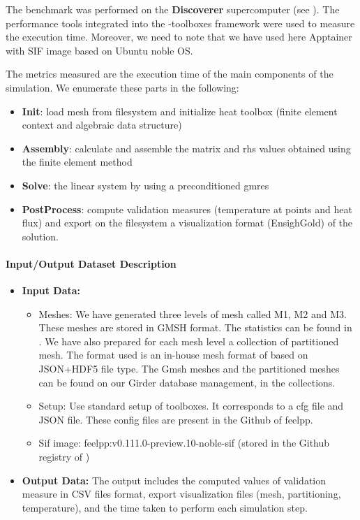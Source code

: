 The benchmark was performed on the \textbf{Discoverer} supercomputer (see
).
The performance tools integrated into the \Feelpp-toolboxes framework were used to measure
the execution time.
Moreover, we need to note that we have used here Apptainer with \Feelpp SIF image based on Ubuntu noble OS.

The metrics measured are the execution time of the main components of the simulation. We enumerate these parts in the following:
\begin{itemize}
\item \textbf{Init}: load mesh from filesystem and initialize heat toolbox (finite element context and algebraic data structure)
\item \textbf{Assembly}: calculate and assemble the matrix and rhs values obtained using the finite element method
\item \textbf{Solve}: the linear system by using a preconditioned gmres
\item \textbf{PostProcess}: compute validation measures (temperature at points and
  heat flux) and export on the filesystem a visualization format (EnsighGold) of
  the solution.
\end{itemize}

\paragraph{Input/Output Dataset Description}

\begin{itemize}
\item \textbf{Input Data:}
  \begin{itemize}
  \item Meshes: We have generated three levels of mesh called M1, M2
    and M3. These meshes are stored in GMSH format. The statistics can be found in
    . We have also prepared for
    each mesh level a collection of partitioned mesh.
    The format used is an in-house mesh format of \Feelpp based on
    JSON+HDF5 file type.
    The Gmsh meshes and the partitioned meshes can be found on our Girder
    database management, in the \Feelpp collections.
  \item Setup: Use standard setup of \Feelpp toolboxes. It corresponds to a cfg
    file and JSON file. These config files are present in the Github of feelpp.
  \item Sif image: feelpp:v0.111.0-preview.10-noble-sif  (stored in the Github registry of \Feelpp)
  \end{itemize}
\item \textbf{Output Data:} The output includes the computed values of
  validation measure in CSV files format, export visualization files (mesh, partitioning, temperature), and the time taken to perform each simulation step.
\end{itemize}



